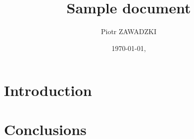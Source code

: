 \documentclass[11pt]{article}
\author{Piotr ZAWADZKI}
\title{Sample document}
\date{\today, \currenttime}
\begin{document}
\maketitle

\begin{abstract}
    \lipsum[1] %
\end{abstract}
    


\section{Introduction}

\lipsum[2-6]

\section{Conclusions}

\lipsum[10]
\end{document}

